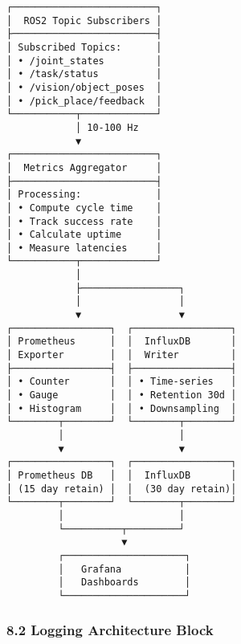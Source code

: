 \documentclass[
]{article}
\begin{document}
\begin{verbatim}
┌─────────────────────────┐
│  ROS2 Topic Subscribers │
├─────────────────────────┤
│ Subscribed Topics:      │
│ • /joint_states         │
│ • /task/status          │
│ • /vision/object_poses  │
│ • /pick_place/feedback  │
└───────────┬─────────────┘
            │ 10-100 Hz
            ▼
┌─────────────────────────┐
│  Metrics Aggregator     │
├─────────────────────────┤
│ Processing:             │
│ • Compute cycle time    │
│ • Track success rate    │
│ • Calculate uptime      │
│ • Measure latencies     │
└───────────┬─────────────┘
            │
            ├─────────────────┐
            │                 │
            ▼                 ▼
┌─────────────────┐  ┌─────────────────┐
│ Prometheus      │  │  InfluxDB       │
│ Exporter        │  │  Writer         │
├─────────────────┤  ├─────────────────┤
│ • Counter       │  │ • Time-series   │
│ • Gauge         │  │ • Retention 30d │
│ • Histogram     │  │ • Downsampling  │
└────────┬────────┘  └────────┬────────┘
         │                    │
         ▼                    ▼
┌─────────────────┐  ┌─────────────────┐
│ Prometheus DB   │  │  InfluxDB       │
│ (15 day retain) │  │  (30 day retain)│
└────────┬────────┘  └────────┬────────┘
         │                    │
         └──────────┬─────────┘
                    ▼
         ┌─────────────────────┐
         │   Grafana           │
         │   Dashboards        │
         └─────────────────────┘
\end{verbatim}

\hypertarget{logging-architecture-block}{%
\subsubsection{8.2 Logging Architecture
Block}\label{logging-architecture-block}}
\end{document}

